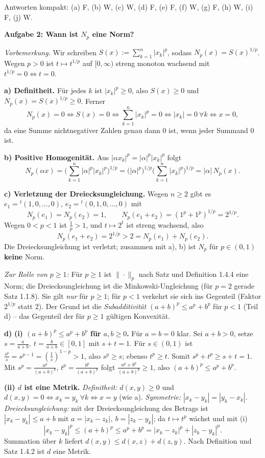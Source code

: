 \documentclass[a4paper,12pt]{article}
\newcommand{\aufgabe}[2]{%
  \bigskip\par\noindent\textbf{Aufgabe #1: #2}\par\nobreak\medskip}
\begin{document}
\medskip
\noindent Antworten kompakt: (a) F, (b) W, (c) W, (d) F, (e) F, (f) W, (g) F, (h) W, (i) F, (j) W.

\aufgabe{2}{Wann ist $N_p$ eine Norm?}

\emph{Vorbemerkung.} Wir schreiben $S(x):=\sum_{k=1}^n |x_k|^p$, sodass $N_p(x)=S(x)^{1/p}$. Wegen $p>0$ ist $t\mapsto t^{1/p}$ auf $[0,\infty)$ streng monoton wachsend mit $t^{1/p}=0\iff t=0$.

\textbf{a) Definitheit.} Für jedes $k$ ist $|x_k|^p\ge 0$, also $S(x)\ge 0$ und $N_p(x)=S(x)^{1/p}\ge 0$. Ferner
\[
N_p(x)=0\iff S(x)=0\iff \sum_{k=1}^n|x_k|^p=0\iff |x_k|=0\ \forall k\iff x=0,
\]
da eine Summe nichtnegativer Zahlen genau dann $0$ ist, wenn jeder Summand $0$ ist.

\textbf{b) Positive Homogenität.} Aus $|\alpha x_k|^p=|\alpha|^p|x_k|^p$ folgt
\[
N_p(\alpha x)=\Big(\sum_{k=1}^n|\alpha|^p|x_k|^p\Big)^{1/p}=\big(|\alpha|^p\big)^{1/p}\Big(\sum_{k=1}^n|x_k|^p\Big)^{1/p}=|\alpha|\,N_p(x).
\]

\textbf{c) Verletzung der Dreiecksungleichung.} Wegen $n\ge 2$ gibt es $e_1={}^t(1,0,\dots,0)$, $e_2={}^t(0,1,0,\dots,0)$ mit
\[
N_p(e_1)=N_p(e_2)=1,\qquad N_p(e_1+e_2)=(1^p+1^p)^{1/p}=2^{1/p}.
\]
Wegen $0<p<1$ ist $\tfrac1p>1$, und $t\mapsto 2^t$ ist streng wachsend, also
\[
N_p(e_1+e_2)=2^{1/p}>2=N_p(e_1)+N_p(e_2).
\]
Die Dreiecksungleichung ist verletzt; zusammen mit a), b) ist $N_p$ für $p\in(0,1)$ \textbf{keine} Norm.

\emph{Zur Rolle von $p\ge 1$:} Für $p\ge 1$ ist $\|\cdot\|_p$ nach Satz und Definition 1.4.4 eine Norm; die Dreiecksungleichung ist die Minkowski-Ungleichung (für $p=2$ gerade Satz 1.1.8). Sie gilt \emph{nur} für $p\ge 1$; für $p<1$ verkehrt sie sich ins Gegenteil (Faktor $2^{1/p}$ statt $2$). Der Grund ist die \emph{Subadditivität} $(a+b)^p\le a^p+b^p$ für $p<1$ (Teil d) -- das Gegenteil der für $p\ge 1$ gültigen Konvexität.

\textbf{d)} \textbf{(i) $(a+b)^p\le a^p+b^p$ für $a,b\ge 0$.} Für $a=b=0$ klar. Sei $a+b>0$, setze $s=\tfrac{a}{a+b},\ t=\tfrac{b}{a+b}\in[0,1]$ mit $s+t=1$. Für $s\in(0,1)$ ist $\tfrac{s^p}{s}=s^{p-1}=(\tfrac1s)^{1-p}>1$, also $s^p\ge s$; ebenso $t^p\ge t$. Somit $s^p+t^p\ge s+t=1$. Mit $s^p=\tfrac{a^p}{(a+b)^p}$, $t^p=\tfrac{b^p}{(a+b)^p}$ folgt $\tfrac{a^p+b^p}{(a+b)^p}\ge 1$, also $(a+b)^p\le a^p+b^p$.

\textbf{(ii) $d$ ist eine Metrik.} \emph{Definitheit:} $d(x,y)\ge 0$ und $d(x,y)=0\iff x_k=y_k\ \forall k\iff x=y$ (wie a). \emph{Symmetrie:} $|x_k-y_k|=|y_k-x_k|$. \emph{Dreiecksungleichung:} mit der Dreiecksungleichung des Betrags ist $|x_k-y_k|\le a+b$ mit $a=|x_k-z_k|,\ b=|z_k-y_k|$; da $t\mapsto t^p$ wächst und mit (i)
\[
|x_k-y_k|^p\le (a+b)^p\le a^p+b^p=|x_k-z_k|^p+|z_k-y_k|^p.
\]
Summation über $k$ liefert $d(x,y)\le d(x,z)+d(z,y)$. Nach Definition und Satz 1.4.2 ist $d$ eine Metrik.
\end{document}
